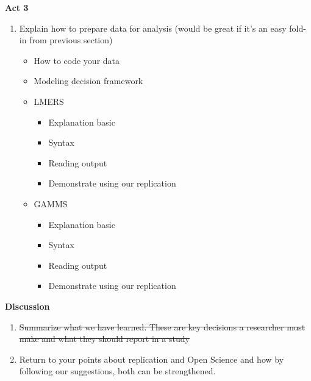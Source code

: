 \textbf{Act 3}

\begin{enumerate}
    \item Explain how to prepare data for analysis (would be great if it’s an easy fold-in from previous section)
    \begin{itemize}
        \item How to code your data
        \item Modeling decision framework
        \item LMERS
        \begin{itemize}
            \item Explanation basic
            \item Syntax
            \item Reading output
            \item Demonstrate using our replication
        \end{itemize}
        \item GAMMS
        \begin{itemize}
            \item Explanation basic
            \item Syntax
            \item Reading output
            \item Demonstrate using our replication
        \end{itemize}
    \end{itemize}
\end{enumerate}

\textbf{Discussion}


\begin{enumerate}
    \item \sout{Summarize what we have learned. These are key decisions a researcher must make and what they should report in a study}
    \item Return to your points about replication and Open Science and how by following our suggestions, both can be strengthened.
\end{enumerate}